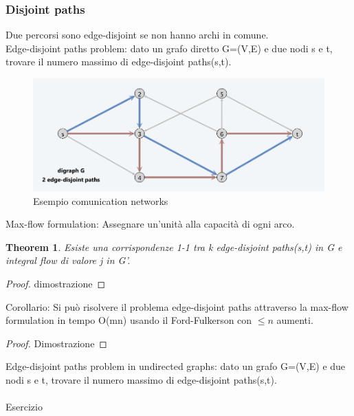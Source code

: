 \documentclass{article}
\newtheorem{theorem}{Theorem}[subsection]
\begin{document}
\subsubsection{Disjoint paths}
Due percorsi sono edge-disjoint se non hanno archi in comune.\\
Edge-disjoint paths problem: dato un grafo diretto G=(V,E) e due nodi s e t, trovare il numero massimo di edge-disjoint paths(s,t).
\begin{figure}[H]
    \centering
    \includegraphics[width=0.5\linewidth]{Screenshot from 2024-05-05 11-29-11.png}
    \caption{Esempio comunication networks}
    \label{fig:enter-label}
\end{figure}
Max-flow formulation: Assegnare un'unità alla capacità di ogni arco.
\begin{theorem}
    Esiste una corrispondenze 1-1 tra k edge-disjoint paths(s,t) in G e integral flow di valore j in G'.
\end{theorem}
\begin{proof}
    dimostrazione
\end{proof}
Corollario: Si può risolvere il problema edge-disjoint paths attraverso la max-flow formulation in tempo O(mn) usando il Ford-Fulkerson con $\leq n$ aumenti.
\begin{proof}
    Dimostrazione
\end{proof}
Edge-disjoint paths problem in undirected graphs: dato un grafo G=(V,E) e due nodi s e t, trovare il numero massimo di edge-disjoint paths(s,t).\\\\
Esercizio\\ \\
\newpage
\end{document}
